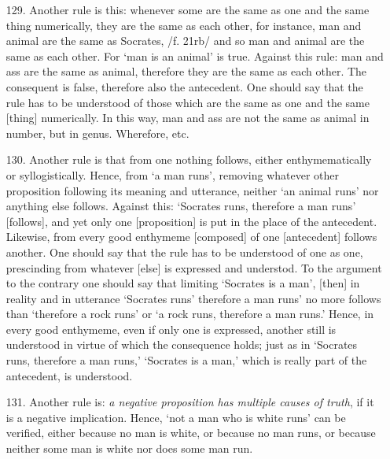\documentclass[]{article}
\begin{document}
\begin{itemize}
\item[129.] Another rule is this: whenever some are the same as one and the same thing numerically, they are the same as each other, for instance, man and animal are the same as Socrates, /f. 21rb/ and so man and animal are the same as each other. For `man is an animal' is true. Against this rule: man and ass are the same as animal, therefore they are the same as each other. The consequent is false, therefore also the antecedent. One should say that the rule has to be understood of those which are the same as one and the same [thing] numerically. In this way, man and ass are not the same as animal in number, but in genus. Wherefore, etc.
\item[130.] Another rule is that from one nothing follows, either enthymematically or syllogistically. Hence, from `a man runs', removing whatever other proposition following its meaning and utterance, neither `an animal runs' nor anything else follows. Against this: `Socrates runs, therefore a man runs' [follows], and yet only one [proposition] is put in the place of the antecedent. Likewise, from every good enthymeme [composed] of one [antecedent] follows another. One should say that the rule has to be understood of one as one, prescinding from whatever [else] is expressed and understod. To the argument to the contrary one should say that limiting `Socrates is a man', [then] in reality and in utterance `Socrates runs' therefore a man runs' no more follows than `therefore a rock runs' or `a rock runs, therefore a man runs.' Hence, in every good enthymeme, even if only one is expressed, another still is understood in virtue of which the consequence holds; just as in `Socrates runs, therefore a man runs,' `Socrates is a man,' which is really part of the antecedent, is understood.
\item[131.] Another rule is: \textit{a negative proposition has multiple causes of truth}, if it is a negative implication. Hence, `not a man who is white runs' can be verified, either because no man is white, or because no man runs, or because neither some man is white nor does some man run.
\end{itemize}
\end{document}
